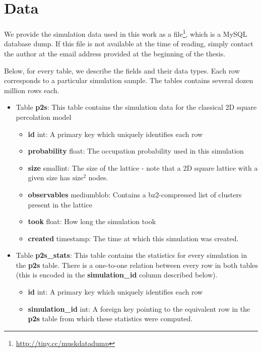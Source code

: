 \clearpage

\chapter{Data}
\label{chap:data}
We provide the simulation data used in this work as a  file\footnote{\url{http://tiny.cc/muskdatadump}}, which is a MySQL database dump. If this file is not available at the time of reading, simply contact the author at the email address provided at the beginning of the thesis.


Below, for every table, we describe the fields and their data types. Each row corresponds to a particular simulation sample. The tables contains several dozen million rows each.

\begin{itemize}
    \item Table \textbf{p2s}: This table contains the simulation data for the classical 2D square percolation model
    \begin{itemize}
        \item \textbf{id} int: A primary key which uniquely identifies each row
        \item \textbf{probability} float: The occupation probability used in this simulation
        \item \textbf{size} smallint: The size of the lattice - note that a 2D square lattice with a given size has $\textrm{size}^2$ nodes.
        \item \textbf{observables} mediumblob: Contains a bz2-compressed list of clusters present in the lattice
        \item \textbf{took} float: How long the simulation took
        \item \textbf{created} timestamp: The time at which this simulation was created.
    \end{itemize}
    \item Table \textbf{p2s\_stats}: This table contains the statistics for every simulation in the \textbf{p2s} table. There is a one-to-one relation between every row in both tables (this is encoded in the \textbf{simulation\_id} column described below).
    \begin{itemize}
        \item \textbf{id} int: A primary key which uniquely identifies each row
        \item \textbf{simulation\_id} int: A foreign key pointing to the equivalent row in the \textbf{p2s} table from which these statistics were computed.

\end{itemize}
\end{itemize}
